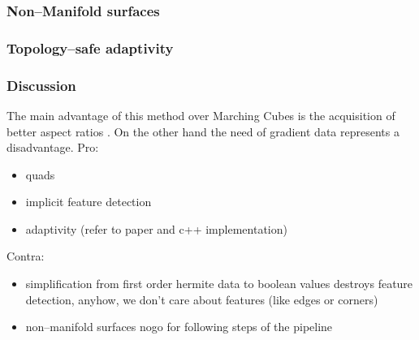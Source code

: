 \subsubsection{Non--Manifold surfaces}

\subsubsection{Topology--safe adaptivity}

\subsubsection{Discussion}
The main advantage of this method over Marching Cubes is the acquisition of better aspect ratios \cite{Hermite2002}. On the other hand the need of gradient data
represents a disadvantage. 
Pro:
\begin{itemize}
\item quads
\item implicit feature detection
\item adaptivity (refer to paper and c++ implementation)
\end{itemize}
Contra:
\begin{itemize}
\item simplification from first order hermite data to boolean values destroys feature detection, anyhow, we don't care about features (like edges or corners)
\item non--manifold surfaces nogo for following steps of the pipeline
\end{itemize}





